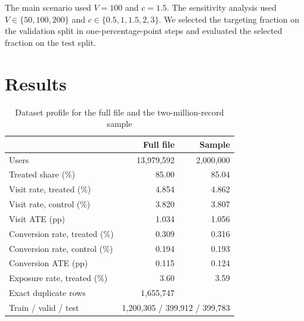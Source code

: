 \documentclass[conference]{IEEEtran}
\begin{document}
The main scenario used \(V=100\) and \(c=1.5\). The sensitivity analysis
used \(V \in \{50,100,200\}\) and \(c \in \{0.5,1,1.5,2,3\}\).
We selected the targeting fraction on the validation split in
one-percentage-point steps and evaluated the selected fraction on the
test split.

\section{Results}

\begin{table}[t]
  \centering
  \caption{Dataset profile for the full file and the two-million-record sample}
  \label{tab:profile}
  \footnotesize
  \begin{tabular}{lrr}
\toprule
 & Full file & Sample \\
\midrule
Users & 13,979,592 & 2,000,000 \\
Treated share (\%) & 85.00 & 85.04 \\
Visit rate, treated (\%) & 4.854 & 4.862 \\
Visit rate, control (\%) & 3.820 & 3.807 \\
Visit ATE (pp) & 1.034 & 1.056 \\
Conversion rate, treated (\%) & 0.309 & 0.316 \\
Conversion rate, control (\%) & 0.194 & 0.193 \\
Conversion ATE (pp) & 0.115 & 0.124 \\
Exposure rate, treated (\%) & 3.60 & 3.59 \\
Exact duplicate rows & 1,655,747 & \\
\midrule
Train / valid / test & \multicolumn{2}{r}{1,200,305 / 399,912 / 399,783} \\
\bottomrule
\end{tabular}
\end{table}
\end{document}
